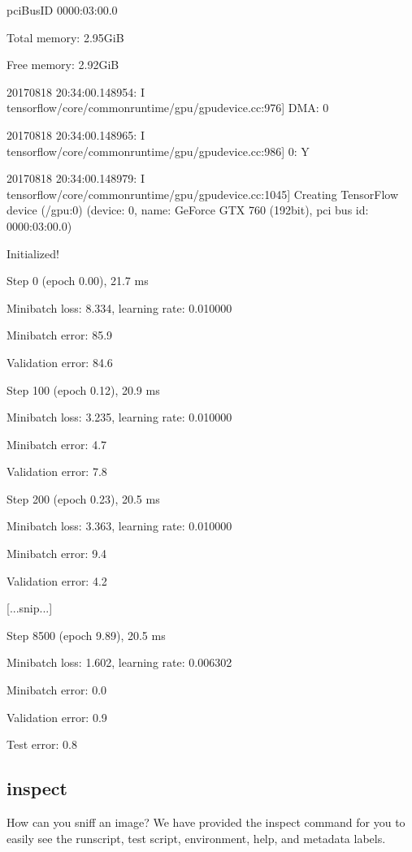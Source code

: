 \documentclass[letterpaper,10pt,english]{sphinxmanual}
\begin{document}
\begin{sphinxVerbatim}[commandchars=\\\{\}]
pciBusID 0000:03:00.0

Total memory: 2.95GiB

Free memory: 2.92GiB

2017\PYGZhy{}08\PYGZhy{}18 20:34:00.148954: I tensorflow/core/common\PYGZus{}runtime/gpu/gpu\PYGZus{}device.cc:976] DMA: 0

2017\PYGZhy{}08\PYGZhy{}18 20:34:00.148965: I tensorflow/core/common\PYGZus{}runtime/gpu/gpu\PYGZus{}device.cc:986] 0:   Y

2017\PYGZhy{}08\PYGZhy{}18 20:34:00.148979: I tensorflow/core/common\PYGZus{}runtime/gpu/gpu\PYGZus{}device.cc:1045] Creating TensorFlow device (/gpu:0) \PYGZhy{}\PYGZgt{} (device: 0, name: GeForce GTX 760 (192\PYGZhy{}bit), pci bus id: 0000:03:00.0)

Initialized!

Step 0 (epoch 0.00), 21.7 ms

Minibatch loss: 8.334, learning rate: 0.010000

Minibatch error: 85.9\PYGZpc{}

Validation error: 84.6\PYGZpc{}

Step 100 (epoch 0.12), 20.9 ms

Minibatch loss: 3.235, learning rate: 0.010000

Minibatch error: 4.7\PYGZpc{}

Validation error: 7.8\PYGZpc{}

Step 200 (epoch 0.23), 20.5 ms

Minibatch loss: 3.363, learning rate: 0.010000

Minibatch error: 9.4\PYGZpc{}

Validation error: 4.2\PYGZpc{}

[...snip...]

Step 8500 (epoch 9.89), 20.5 ms

Minibatch loss: 1.602, learning rate: 0.006302

Minibatch error: 0.0\PYGZpc{}

Validation error: 0.9\PYGZpc{}

Test error: 0.8\PYGZpc{}
\end{sphinxVerbatim}


\subsection{inspect}
\label{\detokenize{appendix:inspect}}\label{\detokenize{appendix:inspect-command}}
How can you sniff an image? We have provided the inspect command for
you to easily see the runscript, test script, environment, help, and
metadata labels.
\end{document}
